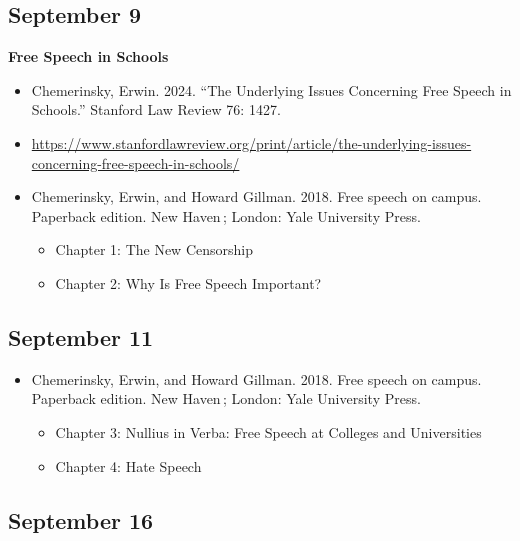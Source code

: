 \documentclass[]{tufte-handout}
\providecommand{\tightlist}{%
  \setlength{\itemsep}{0pt}\setlength{\parskip}{0pt}}
\begin{document}
\hypertarget{september-9}{%
\subsection{September 9}\label{september-9}}

\textbf{Free Speech in Schools}

\begin{itemize}
\item
  Chemerinsky, Erwin. 2024. ``The Underlying Issues Concerning Free
  Speech in Schools.'' Stanford Law Review 76: 1427.
\item
  \url{https://www.stanfordlawreview.org/print/article/the-underlying-issues-concerning-free-speech-in-schools/}
\item
  Chemerinsky, Erwin, and Howard Gillman. 2018. Free speech on campus.
  Paperback edition. New Haven\,; London: Yale University Press.

  \begin{itemize}
  \tightlist
  \item
    Chapter 1: The New Censorship
  \item
    Chapter 2: Why Is Free Speech Important?
  \end{itemize}
\end{itemize}

\hypertarget{september-11}{%
\subsection{September 11}\label{september-11}}

\begin{itemize}
\tightlist
\item
  Chemerinsky, Erwin, and Howard Gillman. 2018. Free speech on campus.
  Paperback edition. New Haven\,; London: Yale University Press.

  \begin{itemize}
  \tightlist
  \item
    Chapter 3: Nullius in Verba: Free Speech at Colleges and
    Universities
  \item
    Chapter 4: Hate Speech
  \end{itemize}
\end{itemize}

\hypertarget{september-16}{%
\subsection{September 16}\label{september-16}}
\end{document}
